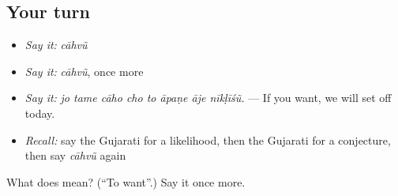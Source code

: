 \subsection*{Your turn}
\begin{itemize}
\raggedright
  \item \emph{Say it:} \emph{cāhvũ}
  \item \emph{Say it:} \emph{cāhvũ}, once more
  \item \emph{Say it:} \emph{jo tame cāho cho to āpaṇe āje nīkḷīśũ.} — If you want, we will set off today.
  \item \emph{Recall:} say the Gujarati for a likelihood, then the Gujarati for a conjecture, then say \emph{cāhvũ} again
\end{itemize}

\begin{tcolorbox}[breakable,colback=teal!4,colframe=teal!35!black,title={Before you move on}]
What does  mean? (\textquotedblleft{}To want\textquotedblright{}.) Say it once more.
\end{tcolorbox}
